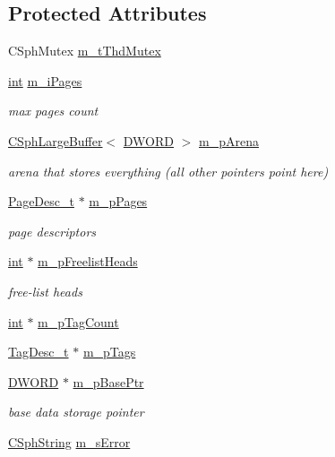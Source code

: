 \subsection*{Protected Attributes}
\begin{DoxyCompactItemize}
\item 
C\-Sph\-Mutex \hyperlink{classCSphArena_a4203298ee95c2e5d146fb0765ef2fee5}{m\-\_\-t\-Thd\-Mutex}
\item 
\hyperlink{sphinxexpr_8cpp_a4a26e8f9cb8b736e0c4cbf4d16de985e}{int} \hyperlink{classCSphArena_ac4a9321f1dc17a1e806bf34c0a785444}{m\-\_\-i\-Pages}
\begin{DoxyCompactList}\small\item\em max pages count \end{DoxyCompactList}\item 
\hyperlink{classCSphLargeBuffer}{C\-Sph\-Large\-Buffer}$<$ \hyperlink{sphinxstd_8h_a798af1e30bc65f319c1a246cecf59e39}{D\-W\-O\-R\-D} $>$ \hyperlink{classCSphArena_a849a50c7be3255ba06be0c671bec31a1}{m\-\_\-p\-Arena}
\begin{DoxyCompactList}\small\item\em arena that stores everything (all other pointers point here) \end{DoxyCompactList}\item 
\hyperlink{structCSphArena_1_1PageDesc__t}{Page\-Desc\-\_\-t} $\ast$ \hyperlink{classCSphArena_ae7fd6cb1413c5e9ad06bb97744116c81}{m\-\_\-p\-Pages}
\begin{DoxyCompactList}\small\item\em page descriptors \end{DoxyCompactList}\item 
\hyperlink{sphinxexpr_8cpp_a4a26e8f9cb8b736e0c4cbf4d16de985e}{int} $\ast$ \hyperlink{classCSphArena_a2192a3b8b0822b1014198238077abf32}{m\-\_\-p\-Freelist\-Heads}
\begin{DoxyCompactList}\small\item\em free-\/list heads \end{DoxyCompactList}\item 
\hyperlink{sphinxexpr_8cpp_a4a26e8f9cb8b736e0c4cbf4d16de985e}{int} $\ast$ \hyperlink{classCSphArena_af9618a82ef74738cbe597635c65e572b}{m\-\_\-p\-Tag\-Count}
\item 
\hyperlink{structCSphArena_1_1TagDesc__t}{Tag\-Desc\-\_\-t} $\ast$ \hyperlink{classCSphArena_aed289a041648e326cba1e26dc6851825}{m\-\_\-p\-Tags}
\item 
\hyperlink{sphinxstd_8h_a798af1e30bc65f319c1a246cecf59e39}{D\-W\-O\-R\-D} $\ast$ \hyperlink{classCSphArena_a356e3e07e8b0071c29329d574d2e6b8f}{m\-\_\-p\-Base\-Ptr}
\begin{DoxyCompactList}\small\item\em base data storage pointer \end{DoxyCompactList}\item 
\hyperlink{structCSphString}{C\-Sph\-String} \hyperlink{classCSphArena_a0643f87576350b3f9f01a41806b300e8}{m\-\_\-s\-Error}
\end{DoxyCompactItemize}
